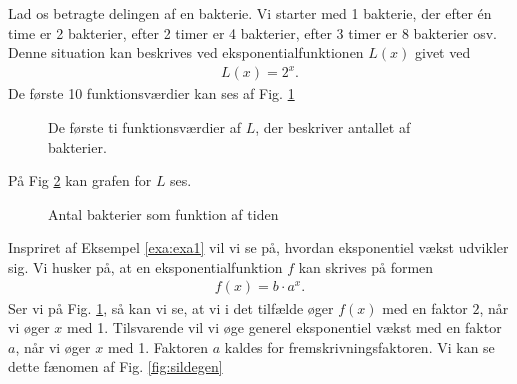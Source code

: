 \documentclass[12pt]{article}
\begin{document}
\begin{exa}\label{exa:exa1}
Lad os betragte delingen af en bakterie. Vi starter med 1 bakterie, der efter én time er 2 bakterier, efter 2 timer er 4 bakterier, efter 3 timer er 8 bakterier osv. Denne situation kan beskrives ved eksponentialfunktionen $L(x)$ givet ved
\begin{align*}
L(x) = 2^x.
\end{align*}
De første 10 funktionsværdier kan ses af Fig. \ref{fig:sildebenfold}
\begin{figure}[H]
\center
{}
\caption{De første ti funktionsværdier af $L$, der beskriver antallet af bakterier. }
\label{fig:sildebenfold}
\end{figure}
På Fig \ref{fig:flagxfold} kan grafen for $L$ ses. 
\begin{figure}[H]
\center
{}
\caption{Antal bakterier som funktion af tiden}
\label{fig:flagxfold}
\end{figure}
\end{exa}
Inspriret af Eksempel \ref{exa:exa1} vil vi se på, hvordan eksponentiel vækst udvikler sig. Vi husker på, at en eksponentialfunktion $f$ kan skrives på formen
\begin{align*}
f(x) = b\cdot a^x.
\end{align*}
Ser vi på Fig. \ref{fig:sildebenfold}, så kan vi se, at vi i det tilfælde øger $f(x)$ med en faktor $2$, når vi øger $x$ med 1. Tilsvarende vil vi øge generel eksponentiel vækst med en faktor $a$, når vi øger $x$ med 1. Faktoren $a$ kaldes for fremskrivningsfaktoren. Vi kan se dette fænomen af Fig. \ref{fig:sildegen}
\end{document}
